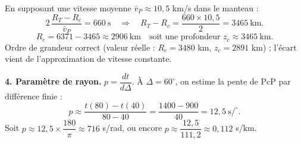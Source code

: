 \documentclass[11pt]{article}
\begin{document}
\begin{corrige}
En supposant une vitesse moyenne $\bar v_P \approx 10{,}5$ km/s dans le manteau :
\[ 2\,\frac{R_T - R_c}{\bar v_P} = 660 \ \text{s} \quad\Rightarrow\quad R_T - R_c = \frac{660 \times 10{,}5}{2} = 3465 \ \text{km}. \]
\[ R_c = 6371 - 3465 \approx 2906 \ \text{km} \quad\text{soit une profondeur } z_c \approx 3465 \ \text{km}. \]
Ordre de grandeur correct (valeur réelle : $R_c = 3480$ km, $z_c = 2891$ km) ; l'écart vient de l'approximation de vitesse constante.

\textbf{4. Paramètre de rayon.} $p = \dfrac{dt}{d\Delta}$. À $\Delta = 60^\circ$, on estime la pente de PcP par différence finie :
\[ p \approx \frac{t(80) - t(40)}{80 - 40} = \frac{1400 - 900}{40} = 12{,}5 \ \text{s}/^\circ. \]
Soit $p \approx 12{,}5 \times \dfrac{180}{\pi} \approx 716$ s/rad, ou encore $p \approx \dfrac{12{,}5}{111{,}2} \approx 0{,}112$ s/km.
\end{corrige}
\end{document}
